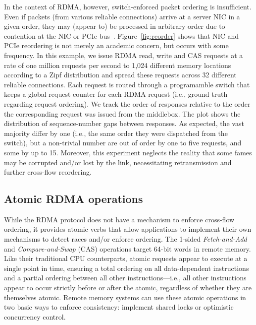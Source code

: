 In the context of RDMA, however, switch-enforced packet ordering is
insufficient.  Even if packets (from various reliable connections)
arrive at a server NIC in a given order, they may (appear to) be
processed in arbitrary order due to contention at the NIC or PCIe
bus~\cite{understanding-pcie}. Figure~\ref{fig:reorder} shows that NIC
and PCIe reordering is not merely an academic concern, but occurs with
some frequency.  In this example, we issue RDMA read, write and CAS
requests at a rate of one million requests per second to 1,024
different memory locations according to a Zipf distribution and spread
these requests across 32 different reliable connections. Each request is routed
through a programamble switch that keeps a global request counter for
each RDMA request (i.e., ground truth regarding request ordering). We
track the order of responses relative to the order the corresponding
request was issued from the middlebox. The plot shows the distribution
of sequence-number gaps between responses. As expected, the vast
majority differ by one (i.e., the same order they were dispatched from
the switch), but a non-trivial number are out of order by one to five
requests, and some by up to 15.  Moreover, this experiment neglects
the reality that some fames may be corrupted and/or lost by the link,
necessitating retransmission and further cross-flow reordering.






\subsection{Atomic RDMA operations} 

While the RDMA protocol does not have a mechanism to enforce
cross-flow ordering, it provides atomic verbs that allow applications
to implement their own mechanisms to detect races and/or enforce
ordering.  The 1-sided \textit{Fetch-and-Add} and
\textit{Compare-and-Swap} (CAS) operations target 64-bit words in
remote memory.  Like their traditional CPU counterparts, atomic
requests appear to execute at a single point in time, ensuring a total
ordering on all data-dependent instructions and a partial ordering
between all other instructions---i.e., all other instructions appear
to occur strictly before or after the atomic, regardless of whether
they are themselves atomic.  Remote memory systems can use these
atomic operations in two basic ways to enforce consistency: implement
shared locks or optimistic concurrency control.

